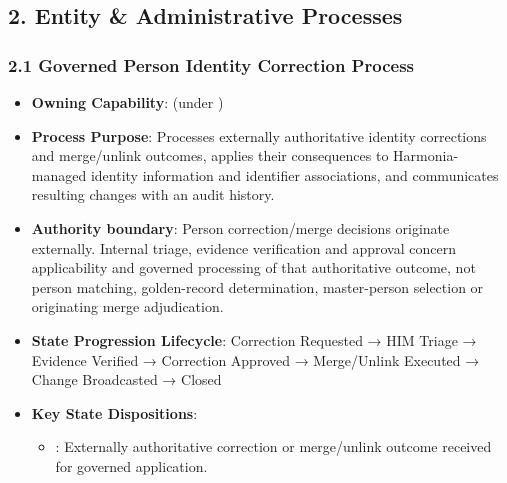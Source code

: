 \par\smallskip
{}\label{rad:processes:67}
\subsection*{2. Entity \& Administrative Processes}
\label{rad:processes:69}
\subsubsection*{2.1 Governed Person Identity Correction Process}
\label{rad:processes:70}

\begin{itemize}

\item 
\textbf{Owning Capability}: \texttt{} (under \texttt{})



\item 
\textbf{Process Purpose}: Processes externally authoritative identity corrections and merge/\allowbreak{}unlink outcomes, applies their consequences to Harmonia-managed identity information and identifier associations, and communicates resulting changes with an audit history.



\item 
\textbf{Authority boundary}: Person correction/\allowbreak{}merge decisions originate externally. Internal triage, evidence verification and approval concern applicability and governed processing of that authoritative outcome, not person matching, golden-record determination, master-person selection or originating merge adjudication.



\item 
\textbf{State Progression Lifecycle}: Correction Requested → HIM Triage → Evidence Verified → Correction Approved → Merge/\allowbreak{}Unlink Executed → Change Broadcasted → Closed



\item 
\textbf{Key State Dispositions}:


\begin{itemize}

\item 
\texttt{}: Externally authoritative correction or merge/\allowbreak{}unlink outcome received for governed application.




\end{itemize}
\end{itemize}
